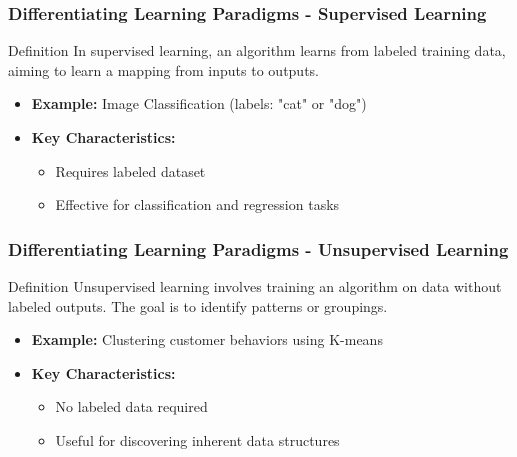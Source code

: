 \documentclass[aspectratio=169]{beamer}
\begin{document}
\begin{frame}[fragile]
    \frametitle{Differentiating Learning Paradigms - Supervised Learning}
    \begin{block}{Definition}
        In supervised learning, an algorithm learns from labeled training data, aiming to learn a mapping from inputs to outputs.
    \end{block}
    \begin{itemize}
        \item \textbf{Example:} Image Classification (labels: "cat" or "dog")
        \item \textbf{Key Characteristics:}
        \begin{itemize}
            \item Requires labeled dataset
            \item Effective for classification and regression tasks
        \end{itemize}
    \end{itemize}
\end{frame}

\begin{frame}[fragile]
    \frametitle{Differentiating Learning Paradigms - Unsupervised Learning}
    \begin{block}{Definition}
        Unsupervised learning involves training an algorithm on data without labeled outputs. The goal is to identify patterns or groupings.
    \end{block}
    \begin{itemize}
        \item \textbf{Example:} Clustering customer behaviors using K-means
        \item \textbf{Key Characteristics:}
        \begin{itemize}
            \item No labeled data required
            \item Useful for discovering inherent data structures
        \end{itemize}
    \end{itemize}
\end{frame}
\end{document}
